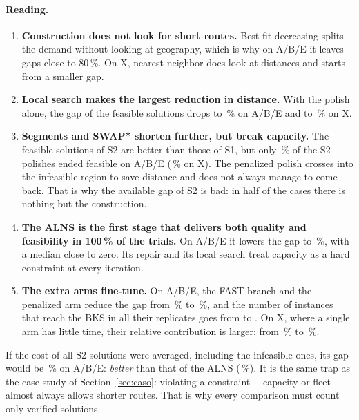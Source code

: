 \documentclass[11pt,a4paper]{article}
\begin{document}
\paragraph{Reading.}
\begin{enumerate}[leftmargin=1.5em]
\item \textbf{Construction does not look for short routes.} Best-fit-decreasing splits the demand
without looking at geography, which is why on A/B/E it leaves gaps close to 80\,\%. On X, nearest
neighbor does look at distances and starts from a smaller gap.
\item \textbf{Local search makes the largest reduction in distance.} With the polish alone, the gap of
the feasible solutions drops to \cgfABEb\,\% on A/B/E and to \cgfXb\,\% on X.
\item \textbf{Segments and SWAP* shorten further, but break capacity.} The feasible solutions of S2 are
better than those of S1, but only \cfeABEc\,\% of the S2 polishes ended feasible on A/B/E
(\cfeXc\,\% on X). The penalized polish crosses into the infeasible region to save distance and does
not always manage to come back. That is why the available gap of S2 is bad: in half of the cases
there is nothing but the construction.
\item \textbf{The ALNS is the first stage that delivers both quality and feasibility in 100\,\% of the
trials.} On A/B/E it lowers the gap to \cgABEd\,\%, with a median close to zero. Its repair and its
local search treat capacity as a hard constraint at every iteration.
\item \textbf{The extra arms fine-tune.} On A/B/E, the FAST branch and the penalized arm reduce the gap
from \cgABEd\,\% to \cgABEf\,\%, and the number of instances that reach the BKS in all their
replicates goes from \cbABEd{} to \cbABEf{}. On X, where a single arm has little time, their relative
contribution is larger: from \cgXd\,\% to \cgXf\,\%.
\end{enumerate}

\begin{leccion}
If the cost of all S2 solutions were averaged, including the infeasible ones, its gap would be
\cgrABEc\,\% on A/B/E: \emph{better} than that of the ALNS (\cgABEd\,\%). It is the same trap as the
case study of Section~\ref{sec:caso}: violating a constraint ---capacity or fleet--- almost always
allows shorter routes. That is why every comparison must count only verified solutions.
\end{leccion}
\end{document}
